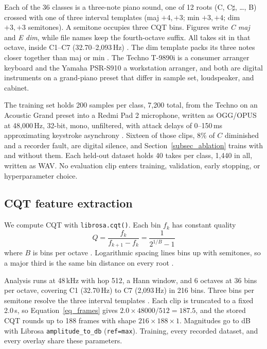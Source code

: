 \documentclass[pdflatex,sn-mathphys-num,iicol]{sn-jnl}
\begin{document}
Each of the 36 classes is a three-note piano sound, one of 12 roots (C, C$\sharp$, \ldots, B) crossed with one of three interval templates (maj $+4,+3$; min $+3,+4$; dim $+3,+3$ semitones). A semitone occupies three CQT bins. Figures write \emph{C maj} and \emph{E dim}, while file names keep the fourth-octave suffix. All takes sit in that octave, inside C1--C7 (32.70--2{,}093\,Hz) \cite{Telila2023,Harte2010}. The dim template packs its three notes closer together than maj or min \cite{Byambatsogt2020}. The Techno T-9890i is a consumer arranger keyboard and the Yamaha PSR-S910 a workstation arranger, and both are digital instruments on a grand-piano preset that differ in sample set, loudspeaker, and cabinet.

The training set holds 200 samples per class, 7{,}200 total, from the Techno on an Acoustic Grand preset into a Redmi Pad 2 microphone, written as OGG/OPUS at 48{,}000\,Hz, 32-bit, mono, unfiltered, with attack delays of 0--150\,ms approximating keystroke asynchrony \cite{Bella2011}. Sixteen of those clips, 8\% of $C$ diminished and a recorder fault, are digital silence, and Section~\ref{subsec_ablation} trains with and without them. Each held-out dataset holds 40 takes per class, 1{,}440 in all, written as WAV. No evaluation clip enters training, validation, early stopping, or hyperparameter choice.

\subsection{CQT feature extraction}\label{subsec_cqt}

We compute CQT with \texttt{librosa.cqt()}. Each bin $f_k$ has constant quality
\begin{equation}
Q = \frac{f_k}{f_{k+1} - f_k} = \frac{1}{2^{1/B} - 1}
\label{eq_cqt}
\end{equation}
where $B$ is bins per octave \cite{Li2021,Lacoste2007}. Logarithmic spacing lines bins up with semitones, so a major third is the same bin distance on every root \cite{Harte2010}.

Analysis runs at 48\,kHz with hop 512, a Hann window, and 6 octaves at 36 bins per octave, covering C1 (32.70\,Hz) to C7 (2{,}093\,Hz) in 216 bins. Three bins per semitone resolve the three interval templates \cite{Akram2025}. Each clip is truncated to a fixed 2.0\,s, so Equation~\ref{eq_frames} gives $2.0\times 48000/512=187.5$, and the stored CQT rounds up to 188 frames with shape $216 \times 188 \times 1$. Magnitudes go to dB with Librosa \texttt{amplitude\_to\_db} (\texttt{ref=max}). Training, every recorded dataset, and every overlay share these parameters.
\end{document}
